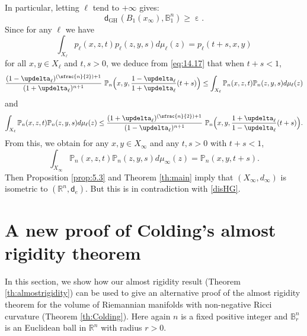 \documentclass[10pt]{amsart}
\newcommand{\Psfrac}[2]{(\sfrac{#1}{#2})}
\newcommand{\sGH}{{\scriptscriptstyle\mathrm{GH}\,}}
\theoremstyle{plain}
\theoremstyle{definition}
\newcommand{\setR}{\mathbb{R}}
\newcommand{\bP}{\mathbb{P}}
\newcommand{\setB}{\mathbb{B}}
\newcommand{\dist}{\mathsf{d}}
\begin{document}
In particular, letting $\ell$ tend to $+\infty$ gives:
\begin{equation}\label{disHG}\dist_{\sGH}\left(B_1(x_\infty), \setB^n_1\right) \ge \upepsilon.\end{equation}
Since for any $\ell$ we have
\[
\int_{X_\ell}p_\ell(x,z,t)p_\ell(z,y,s)d\mu_\ell(z)=p_\ell(t+s,x,y)
\]
for all $x,y \in X_\ell$ and $t,s>0$, we deduce from \eqref{eq:14.17} that when $t+s<1$,
\[
\frac{(1-\updelta_\ell)^{\Psfrac n2+1}}{(1+\updelta_\ell)^{n+1}}\ \bP_n\Bigl(x,y,\frac{1-\updelta_\ell}{1+\updelta_\ell}(t+s)\Bigr)\le \int_{X_\ell}\bP_n(x,z,t)\bP_n(z,y,s)d\mu_\ell(z)
\]
and
\[
\int_{X_\ell}\bP_n(x,z,t)\bP_n(z,y,s)d\mu_\ell(z)\le \frac{(1+\updelta_\ell)^{\Psfrac n2+1}}{(1-\updelta_\ell)^{n+1}}\ \bP_n\Bigl(x,y,\frac{1+\updelta_\ell}{1-\updelta_\ell}(t+s)\Bigr).
\]
From this, we obtain for any $x,y\in X_\infty$ and any $t,s>0$ with $t+s<1$,
\[
\int_{X_\infty}\bP_n(x,z,t)\bP_n(z,y,s)d\mu_\infty(z)= \bP_n(x,y,t+s).
\]
Then Proposition \ref{prop:5.3} and Theorem \ref{th:main} imply that $(X_\infty,d_\infty)$ is isometric to $(\setR^n,\dist_e)$. But this is in contradiction with \eqref{disHG}.
\endproof

\section{A new proof of Colding's almost rigidity theorem}\label{sec:6}

In this section, we show how our almost rigidity result (Theorem \ref{th:almostrigidity}) can be used to give an alternative proof of the almost rigidity theorem for the volume of Riemannian manifolds with non-negative Ricci curvature (Theorem \ref{th:Colding}). Here again $n$ is a fixed positive integer and $\mathbb{B}_r^n$ is an Euclidean ball in $\setR^n$ with radius $r>0$.
\end{document}
